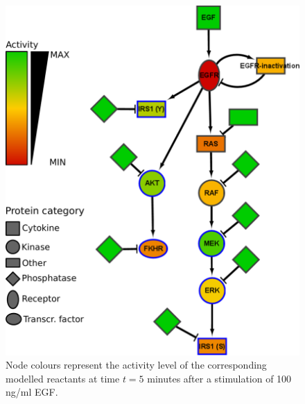 \documentclass{bmcart}
\begin{document}
\begin{figure}[!tpb]
\begin{minipage}{\textwidth}
\centering
  \includegraphics[width=.7\textwidth]{Figures/S8}
\caption{ Node colours represent the
activity level of the corresponding modelled reactants at time $t = 5$ minutes after
a stimulation of 100 ng/ml EGF.}\label{fig:large-model-egf}
\end{minipage}
\end{figure}
\end{document}
